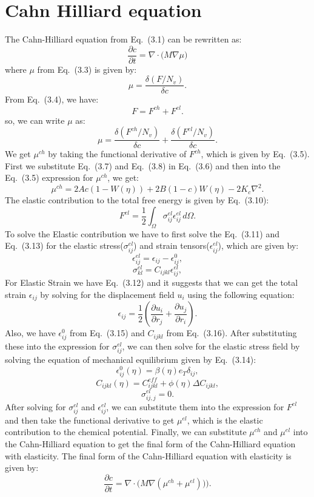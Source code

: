 \section{Cahn Hilliard equation} 
The Cahn-Hilliard equation from Eq.~(3.1) can be rewritten as:
\[
\frac{\partial c}{\partial t}=\nabla\cdot\bigl(M\nabla\mu\bigr)
\]
where $\mu$ from Eq.~(3.3) is given by:
\[
\mu=\frac{\delta (F/N_v)}{\delta c}.
\]
From Eq.~(3.4), we have:
\[
F=F^{ch}+F^{el}.
\]
so, we can write $\mu$ as:
\[
\mu=\frac{\delta (F^{ch}/N_v)}{\delta c}+\frac{\delta (F^{el}/N_v)}{\delta c}.
\]
We get $\mu^{ch}$ by taking the functional derivative of $F^{ch}$, which is given by Eq.~(3.5). First we substitute Eq.~(3.7) and Eq.~(3.8) in Eq.~(3.6) and then into the Eq.~(3.5) expression for $\mu^{ch}$, we get:
\[
\mu^{ch}=2Ac(1-W(\eta))+2B(1-c)W(\eta)-2K_c\nabla^2.
\]
The elastic contribution to the total free energy is given by Eq.~(3.10):
\[
F^{el}=\frac{1}{2}\int_\Omega \sigma_{ij}^{el}\epsilon_{ij}^{el}\,d\Omega.
\]
To solve the Elastic contribution we have to first solve the Eq.~(3.11) and Eq.~(3.13) for the elastic stress($\sigma_{ij}^{el}$) and strain tensors($\epsilon_{ij}^{el}$), which are given by:
\[
\epsilon_{ij}^{el}=\epsilon_{ij}-\epsilon_{ij}^{0},
\]
\[\sigma_{kl}^{el}=C_{ijkl}\epsilon_{ij}^{el},
\]
For Elastic Strain we have Eq.~(3.12) and it suggests that we can get the total strain $\epsilon_{ij}$ by solving for the displacement field $u_i$ using the following equation:
\[\epsilon_{ij}=\frac{1}{2}\left(\frac{\partial u_i}{\partial r_j}+\frac{\partial u_j}{\partial r_i}\right).    
\]
Also, we have $\epsilon_{ij}^{0}$ from Eq.~(3.15) and $C_{ijkl}$ from Eq.~(3.16). After substituting these into the expression for $\sigma_{ij}^{el}$, we can then solve for the elastic stress field by solving the equation of mechanical equilibrium given by Eq.~(3.14):
\[\epsilon_{ij}^{0}(\eta)=\beta(\eta)e_T\delta_{ij},
\]
\[C_{ijkl}(\eta)=C_{ijkl}^{eff}+\phi(\eta)\Delta C_{ijkl},
\]
\[\sigma_{ij,j}^{el}=0.
\]
After solving for $\sigma_{ij}^{el}$ and $\epsilon_{ij}^{el}$, we can substitute them into the expression for $F^{el}$ and then take the functional derivative to get $\mu^{el}$, which is the elastic contribution to the chemical potential. Finally, we can substitute $\mu^{ch}$ and $\mu^{el}$ into the Cahn-Hilliard equation to get the final form of the Cahn-Hilliard equation with elasticity. The final form of the Cahn-Hilliard equation with elasticity is given by:
\[
\frac{\partial c}{\partial t}=\nabla\cdot\bigl(M\nabla(\mu^{ch}+\mu^{el}))\bigr).
\]
